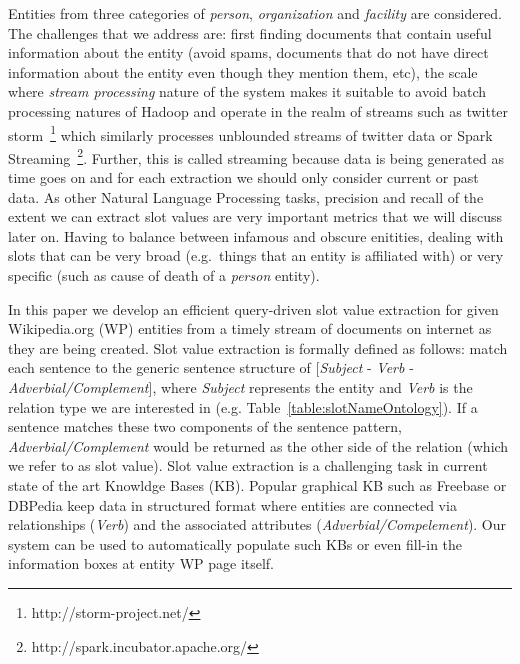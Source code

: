 Entities from three categories of \textit{person}, \textit{organization} and \textit{facility} are considered. The challenges that we address are: first finding documents that contain useful information about the entity (avoid spams, documents that do not have direct information about the entity even though they mention them, etc), the scale where \textit{stream processing} nature of the system makes it suitable to avoid batch processing natures of Hadoop and operate in the realm of streams such as twitter storm~\footnote{http://storm-project.net/} which similarly processes unblounded streams of twitter data or Spark Streaming~\footnote{http://spark.incubator.apache.org/}. Further, this is called streaming because data is being generated as time goes
on and for each extraction we should only consider current or past data. As other Natural Language Processing tasks, precision and recall of the extent we can extract slot values are very important metrics that we will discuss later on. Having to balance between infamous and obscure enitities, dealing with slots that can be very broad (e.g.\ things that an entity is affiliated with) or very specific (such as cause of death of a \textit{person} entity).

In this paper we develop an efficient query-driven slot value extraction for given Wikipedia.org (WP) entities from a timely stream of documents on internet as they are being created. Slot value extraction is formally defined as follows: match each sentence to the generic sentence structure of [\textit{Subject} - \textit{Verb} - \textit{Adverbial/Complement}]\cite{sentencePatterns08}, where  \textit{Subject} represents the entity and \textit{Verb} is the relation type we are interested in (e.g. Table~\ref{table:slotNameOntology}). If a sentence matches these two components of the sentence pattern, \textit{Adverbial/Complement} would be returned as the other side of the relation (which we refer to as slot value). Slot value extraction is a challenging task in current state of the art Knowldge Bases (KB). Popular graphical KB such as Freebase or DBPedia keep data in structured format where entities are connected via relationships (\textit{Verb}) and the associated attributes (\textit{Adverbial/Compelement}). Our system can be used to automatically populate such KBs or even fill-in the information boxes at entity WP page itself.



